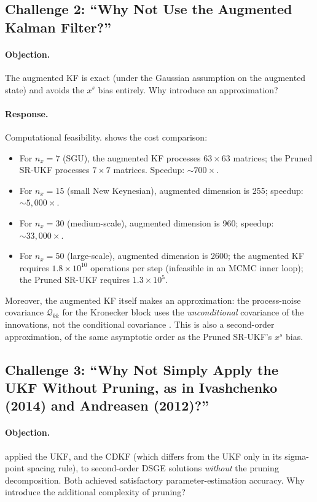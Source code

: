 \documentclass[12pt,a4paper]{article}
\newcommand{\xs}{{x^{s}}}
\begin{document}
\subsection{Challenge 2: ``Why Not Use the Augmented Kalman Filter?''}
\label{sec:challenge-augkf}

\paragraph{Objection.}
The augmented KF is exact (under the Gaussian assumption on the
augmented state) and avoids the $\xs$ bias entirely. Why introduce
an approximation?

\paragraph{Response.}
Computational feasibility.  shows the cost comparison:
\begin{itemize}[nosep]
\item For $n_x = 7$ (SGU), the augmented KF processes
$63 \times 63$ matrices; the Pruned SR-UKF processes
$7 \times 7$ matrices. Speedup: $\sim 700\times$.
\item For $n_x = 15$ (small New Keynesian), augmented dimension is
255; speedup: $\sim 5{,}000\times$.
\item For $n_x = 30$ (medium-scale), augmented dimension is 960;
speedup: $\sim 33{,}000\times$.
\item For $n_x = 50$ (large-scale), augmented dimension is 2600;
the augmented KF requires $1.8 \times 10^{10}$ operations per step
(infeasible in an MCMC inner loop); the Pruned SR-UKF requires
$1.3 \times 10^5$.
\end{itemize}

Moreover, the augmented KF itself makes an approximation: the
process-noise covariance $\mathcal{Q}_{kk}$ for the Kronecker block
uses the \emph{unconditional} covariance of the innovations, not the
conditional covariance \citep[p.~12]{andreasen2018pruned}. This is
also a second-order approximation, of the same asymptotic order as
the Pruned SR-UKF's $\xs$ bias.

\subsection{Challenge 3: ``Why Not Simply Apply the UKF Without Pruning,
as in Ivashchenko (2014) and Andreasen (2012)?''}
\label{sec:challenge-unpruned}

\paragraph{Objection.}
\citet{ivashchenko2014dsge} applied the UKF, and
\citet{andreasen2012non} the CDKF (which differs from the UKF only
in its sigma-point spacing rule), to second-order DSGE solutions
\emph{without} the pruning decomposition. Both achieved satisfactory
parameter-estimation accuracy. Why introduce the additional
complexity of pruning?
\end{document}
